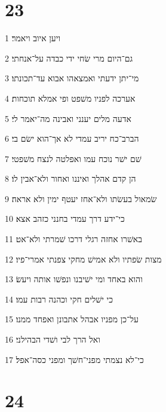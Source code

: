 \chapter{23}

\par 1 ויען איוב ויאמר׃
\par 2 גם־היום מרי שׂחי ידי כבדה על־אנחתי׃
\par 3 מי־יתן ידעתי ואמצאהו אבוא עד־תכונתו׃
\par 4 אערכה לפניו משׁפט ופי אמלא תוכחות׃
\par 5 אדעה מלים יענני ואבינה מה־יאמר לי׃
\par 6 הברב־כח יריב עמדי לא אך־הוא ישׂם בי׃
\par 7 שׁם ישׁר נוכח עמו ואפלטה לנצח משׁפטי׃
\par 8 הן קדם אהלך ואיננו ואחור ולא־אבין לו׃
\par 9 שׂמאול בעשׂתו ולא־אחז יעטף ימין ולא אראה׃
\par 10 כי־ידע דרך עמדי בחנני כזהב אצא׃
\par 11 באשׁרו אחזה רגלי דרכו שׁמרתי ולא־אט׃
\par 12 מצות שׂפתיו ולא אמישׁ מחקי צפנתי אמרי־פיו׃
\par 13 והוא באחד ומי ישׁיבנו ונפשׁו אותה ויעשׂ׃
\par 14 כי ישׁלים חקי וכהנה רבות עמו׃
\par 15 על־כן מפניו אבהל אתבונן ואפחד ממנו׃
\par 16 ואל הרך לבי ושׁדי הבהילני׃
\par 17 כי־לא נצמתי מפני־חשׁך ומפני כסה־אפל׃

\chapter{24}

